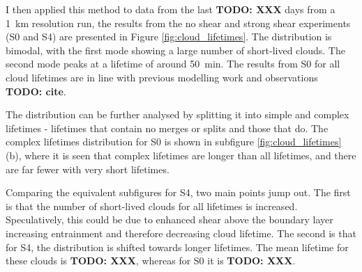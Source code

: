 \documentclass[11pt,a4paper]{article}
\newcommand\todo[1]{\textbf{TODO: #1}}
\begin{document}
I then applied this method to data from the last \todo{XXX} days from a \SI{1}{km} resolution run, the results from the no shear and strong shear experiments (S0 and S4) are presented in Figure \ref{fig:cloud_lifetimes}. 
The distribution is bimodal, with the first mode showing a large number of short-lived clouds. The second mode peaks at a lifetime of around \SI{50}{min}. 
The results from S0 for all cloud lifetimes are in line with previous modelling work \cite{plant2008stochastic} and observations \todo{cite}.

The distribution can be further analysed by splitting it into simple and complex lifetimes - lifetimes that contain no merges or splits and those that do. The complex lifetimes distribution for S0 is shown in subfigure \ref{fig:cloud_lifetimes} (b), where it is seen that complex lifetimes are longer than all lifetimes, and there are far fewer with very short lifetimes. 

Comparing the equivalent subfigures for S4, two main points jump out. The first is that the number of short-lived clouds for all lifetimes is increased. Speculatively, this could be due to enhanced shear above the boundary layer increasing entrainment and therefore decreasing cloud lifetime. The second is that for S4, the distribution is shifted towards longer lifetimes. The mean lifetime for these clouds is \todo{XXX}, whereas for S0 it is \todo{XXX}.
\end{document}
